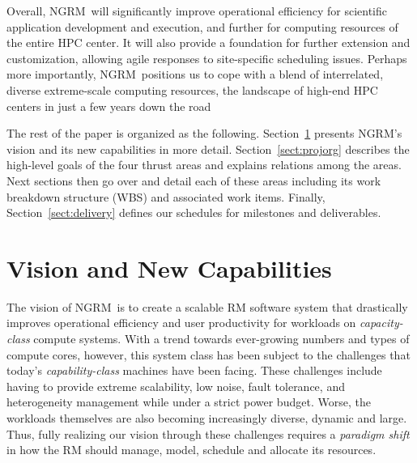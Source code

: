 \documentclass{article}
\newcommand{\ngrm}{NGRM}
\begin{document}
Overall, \ngrm\ will significantly improve operational efficiency for
scientific application development and execution, and further for computing
resources of the entire HPC center.  It will also provide
a foundation for further extension and customization, allowing agile responses
to site-specific scheduling issues. Perhaps more importantly, \ngrm\
positions us to cope with a blend of interrelated, diverse
extreme-scale computing resources, the landscape of high-end HPC centers
in just a few years down the road

The rest of the paper is organized as the following.
Section~\ref{sect:vision} presents \ngrm's vision and 
its new capabilities in more detail. Section~\ref{sect:projorg}  
describes the high-level goals of the four thrust areas and
explains relations among the areas. Next sections then 
go over and detail each of these areas including 
its work breakdown structure (WBS) and associated work items.
Finally, Section~\ref{sect:delivery} defines
our schedules for milestones and deliverables.


\section{Vision and New Capabilities}
\label{sect:vision}

The vision of \ngrm\ is to create a scalable RM software system that 
drastically improves operational efficiency and user productivity 
for workloads on {\em capacity-class} compute systems.
With a trend towards ever-growing numbers and types of compute cores, however,
this system class has been subject to the challenges that
today's {\em capability-class} machines have been facing. 
These challenges include having to provide extreme scalability, low noise, 
fault tolerance, and heterogeneity management while under a strict power budget.
Worse, the workloads themselves are also becoming increasingly diverse, 
dynamic and large. Thus, fully realizing our vision through these challenges requires
a {\em paradigm shift} in how the RM should manage, model, schedule 
and allocate its resources.
\end{document}
